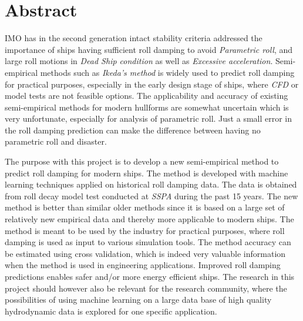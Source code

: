 \section{Abstract}
\label{se:abstract}
IMO has in the second generation intact stability criteria addressed the importance of ships having sufficient roll damping to avoid \emph{Parametric roll}, and large roll motions in \emph{Dead Ship condition} as well as \emph{Excessive acceleration}. Semi-empirical methods such as \emph{Ikeda's method} is widely used to predict roll damping for practical purposes, especially in the early design stage of ships, where \emph{CFD} or model tests are not feasible options. The applicability and accuracy of existing semi-empirical methods for modern hullforms are somewhat uncertain which is very unfortunate, especially for analysis of parametric roll. Just a small error in the roll damping prediction can make the difference between having no parametric roll and disaster.

The purpose with this project is to develop a new semi-empirical method to predict roll damping for modern ships. The method is developed with machine learning techniques applied on historical roll damping data. The data is obtained from roll decay model test conducted at \emph{SSPA} during the past 15 years. The new method is better than similar older methods since it is based on a large set of relatively new empirical data and thereby more applicable to modern ships. The method is meant to be used by the industry for practical purposes, where roll damping is used as input to various simulation tools. The method accuracy can be estimated using cross validation, which is indeed very valuable information when the method is used in engineering applications. Improved roll damping predictions enables safer and/or more energy efficient ships.
The research in this project should however also be relevant for the research community, where the possibilities of using machine learning on a large data base of high quality hydrodynamic data is explored for one specific application.

\newpage